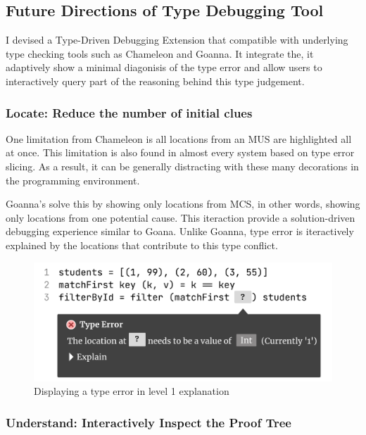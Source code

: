 \subsection{Future Directions of Type Debugging Tool}

I devised a Type-Driven Debugging Extension that compatible with underlying type checking tools such as Chameleon and Goanna.  It integrate the, it adaptively show a minimal diagonisis of the type error and allow users to interactively query part of the reasoning behind this type judgement.  


\subsubsection{Locate: Reduce the number of initial clues}

One limitation from Chameleon is all locations from an MUS are highlighted all at once. This limitation is also found in almost every system based on type error slicing.   As a result, it can be generally distracting with these many decorations in the programming environment. 

Goanna's solve this by  showing only locations from MCS, in other words, showing only locations from one potential cause. 
This iteraction provide a  solution-driven debugging experience similar to Goana. Unlike Goanna, type error is iteractively explained by the locations that contribute to this type conflict.

\begin{figure}[hbt]
    \includegraphics[width=\linewidth]{Debugging-1}
    \caption{
        Displaying a type error in level 1 explanation
      }
  \end{figure}


\subsubsection{Understand: Interactively Inspect the Proof Tree}

